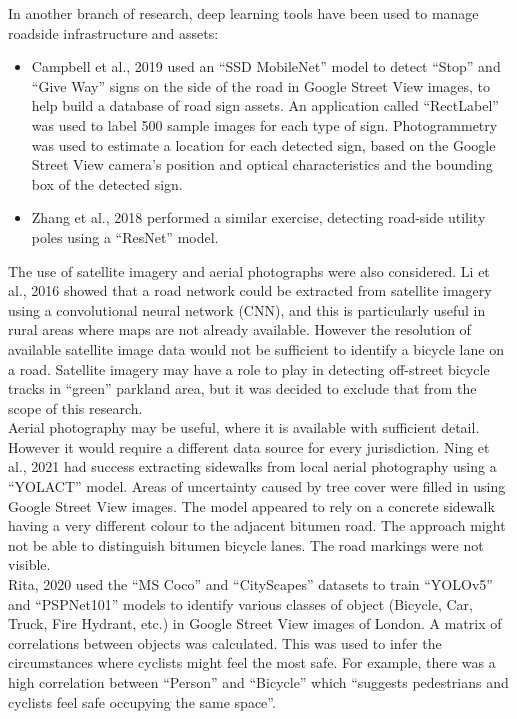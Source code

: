 \documentclass{article}
\begin{document}
In another branch of research, deep learning tools have been used to manage roadside infrastructure and assets:
\begin{itemize}
\item{Campbell et al., 2019 \cite{CAMPBELL2019101350}	 used an ``SSD MobileNet'' model to detect ``Stop'' and ``Give Way'' signs on the side of the road in Google Street View images, to help build a database of road sign assets.  An application called ``RectLabel'' was used to label 500 sample images for each type of sign.  Photogrammetry was used to estimate a location for each detected sign, based on the Google Street View camera's position and optical characteristics and the bounding box of the detected sign.}
\item{Zhang et al., 2018 \cite{s18082484} performed a similar exercise, detecting road-side utility poles using a ``ResNet'' model.}
\end{itemize}

The use of satellite imagery and aerial photographs were also considered.  Li et al., 2016 \cite{ROADNETWORK} showed that a road network could be extracted from satellite imagery using a convolutional neural network (CNN), and this is particularly useful in rural areas where maps are not already available.  However the resolution of available satellite image data would not be sufficient to identify a bicycle lane on a road.  Satellite imagery may have a role to play in detecting off-street bicycle tracks in ``green'' parkland area, but it was decided to exclude that from the scope of this research.
\\

Aerial photography may be useful, where it is available with sufficient detail.  However it would require a different data source for every jurisdiction.  Ning et al., 2021 \cite{NING2021} had success extracting sidewalks from local aerial photography using a ``YOLACT'' model.  Areas of uncertainty caused by tree cover were filled in using Google Street View images.  The model appeared to rely on a concrete sidewalk having a very different colour to the adjacent bitumen road.  The approach might not be able to distinguish bitumen bicycle lanes.  The road markings were not visible.
\\

Rita, 2020 \cite{rita_2020} used the ``MS Coco'' and ``CityScapes'' datasets to train ``YOLOv5'' and ``PSPNet101'' models to identify various classes of object (Bicycle, Car, Truck, Fire Hydrant, etc.) in Google Street View images of London.  A matrix of correlations between objects was calculated.  This was used to infer the circumstances where cyclists might feel the most safe.  For example, there was a high correlation between ``Person'' and ``Bicycle'' which ``suggests pedestrians and cyclists feel safe occupying the same space''.
\\
\end{document}
